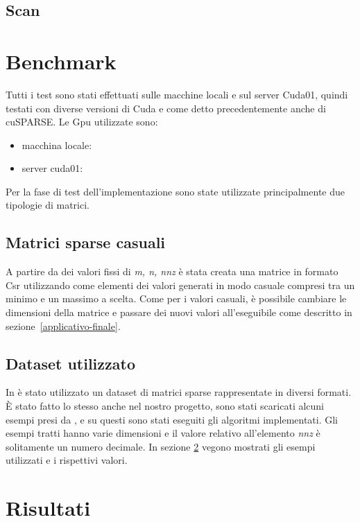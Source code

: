 \documentclass[]{IEEEtran}
\begin{document}
	\subsection{Scan}
	\label{scan}
	

\section{Benchmark}
\label{benchmark}
	Tutti i test sono stati effettuati sulle macchine locali e sul server Cuda01, quindi testati con diverse versioni di Cuda e come detto precedentemente anche di cuSPARSE. Le Gpu utilizzate sono:
	\begin{itemize}
		\item macchina locale:	%
		\item server cuda01:
	\end{itemize}
	Per la fase di test dell'implementazione sono state utilizzate principalmente due tipologie di matrici.
	
	\subsection{Matrici sparse casuali}
	A partire da dei valori fissi di \textit{m, n, nnz} è stata creata una matrice in formato Csr utilizzando come elementi dei valori generati in modo casuale compresi tra un minimo e un massimo a scelta. Come per i valori casuali, è possibile cambiare le dimensioni della matrice e passare dei nuovi valori all'eseguibile come descritto in sezione~\ref{applicativo-finale}.
	
	\subsection{Dataset utilizzato}
	In \cite{parallelTrans} è stato utilizzato un dataset di matrici sparse rappresentate in diversi formati. È stato fatto lo stesso anche nel nostro progetto, sono stati scaricati alcuni esempi presi da \cite{dataset}, e su questi sono stati eseguiti gli algoritmi implementati. Gli esempi tratti hanno varie dimensioni e il valore relativo all'elemento \textit{nnz} è solitamente un numero decimale. In sezione \ref{risultati} vegono mostrati gli esempi utilizzati e i rispettivi valori.
	

\section{Risultati}
	\label{risultati}
	
\end{document}
